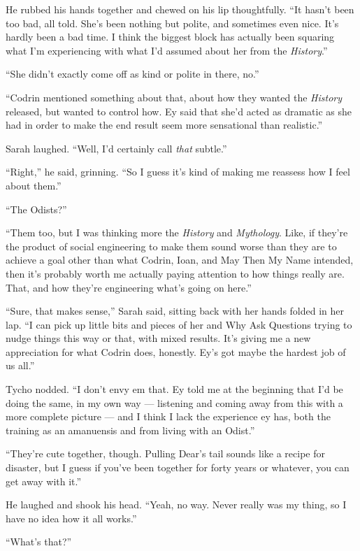 He rubbed his hands together and chewed on his lip thoughtfully. ``It hasn't been too bad, all told. She's been nothing but polite, and sometimes even nice. It's hardly been a bad time. I think the biggest block has actually been squaring what I'm experiencing with what I'd assumed about her from the \emph{History}.''

``She didn't exactly come off as kind or polite in there, no.''

``Codrin mentioned something about that, about how they wanted the \emph{History} released, but wanted to control how. Ey said that she'd acted as dramatic as she had in order to make the end result seem more sensational than realistic.''

Sarah laughed. ``Well, I'd certainly call \emph{that} subtle.''

``Right,'' he said, grinning. ``So I guess it's kind of making me reassess how I feel about them.''

``The Odists?''

``Them too, but I was thinking more the \emph{History} and \emph{Mythology}. Like, if they're the product of social engineering to make them sound worse than they are to achieve a goal other than what Codrin, Ioan, and May Then My Name intended, then it's probably worth me actually paying attention to how things really are. That, and how they're engineering what's going on here.''

``Sure, that makes sense,'' Sarah said, sitting back with her hands folded in her lap. ``I can pick up little bits and pieces of her and Why Ask Questions trying to nudge things this way or that, with mixed results. It's giving me a new appreciation for what Codrin does, honestly. Ey's got maybe the hardest job of us all.''

Tycho nodded. ``I don't envy em that. Ey told me at the beginning that I'd be doing the same, in my own way — listening and coming away from this with a more complete picture — and I think I lack the experience ey has, both the training as an amanuensis and from living with an Odist.''

``They're cute together, though. Pulling Dear's tail sounds like a recipe for disaster, but I guess if you've been together for forty years or whatever, you can get away with it.''

He laughed and shook his head. ``Yeah, no way. Never really was my thing, so I have no idea how it all works.''

``What's that?''

